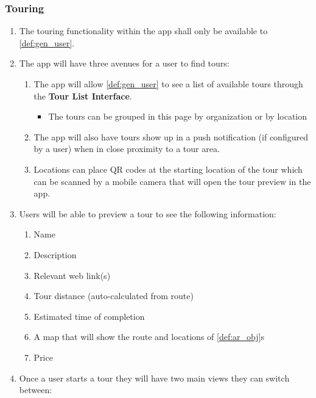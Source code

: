 \documentclass{article}
\begin{document}
\subsubsection{Touring}
\label{ssub:touring}

\begin{enumerate}[align=left, label=\textbf{TR-FR\arabic*:}]
    \item The touring functionality within the app shall only be available to \ref{def:gen_user}.
    \item The app will have three avenues for a user to find tours:
    \begin{enumerate}[align=left, label=\textbf{TR-FR2.\arabic*:}]
        \item The app will allow \ref{def:gen_user} to see a list of available tours through the \textbf{Tour List Interface}.
        \begin{itemize}
            \item The tours can be grouped in this page by organization or by location
        \end{itemize}
        \item The app will also have tours show up in a push notification (if configured by a user) when in close proximity to a tour area.
        \item Locations can place QR codes at the starting location of the tour which can be scanned by a mobile camera that will open the tour preview in the app.
    \end{enumerate}
    \item Users will be able to preview a tour to see the following information:
    \begin{enumerate}
        \item Name
        \item Description
        \item Relevant web link(s)
        \item Tour distance (auto-calculated from route)
        \item Estimated time of completion
        \item A map that will show the route and locations of \ref{def:ar_obj}s
        \item Price
    \end{enumerate}
    \item Once a user starts a tour they will have two main views they can switch between:
    \begin{enumerate}[align=left, label=\textbf{TR-FR4.\arabic*:}]

\end{enumerate}
\end{enumerate}
\end{document}
